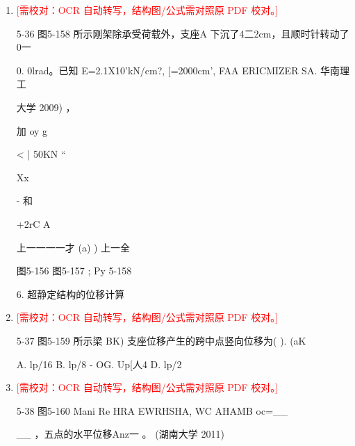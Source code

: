 \documentclass[UTF8,12pt,a4paper,openany]{ctexbook}
\newcommand{\TODO}[1]{\textcolor{red}{[需校对：#1]}}
\begin{document}
\begin{enumerate}[label=\textbf{\arabic*.},leftmargin=2em]
\item \TODO{OCR 自动转写，结构图/公式需对照原 PDF 校对。}\par 5-36 图5-158 所示刚架除承受荷载外，支座A 下沉了4二2cm，且顺时针转动了0一\par 0. 0lrad。已知 E=2.1X10'kN/cm?, [=2000cm', FAA ERICMIZER SA. 华南理工\par 大学 2009)                              ，\par 加       oy        g\par <              |      50KN              “\par Xx\par -                                   和\par +2rC                                              A\par 上一一一一才           (a)                )          上一全\par 图5-156                    图5-157        ;   Py 5-158\par 6. 超静定结构的位移计算
\item \TODO{OCR 自动转写，结构图/公式需对照原 PDF 校对。}\par 5-37 图5-159 所示梁 BK) 支座位移产生的跨中点竖向位移为(  ). (aK\par A. lp/16        B. lp/8 - OG. Up[人4        D. lp/2
\item \TODO{OCR 自动转写，结构图/公式需对照原 PDF 校对。}\par 5-38 图5-160 Mani Re HRA EWRHSHA, WC AHAMB oc=\_\_\par \_\_ ，五点的水平位移Anz一        。 (湖南大学 2011)

\end{enumerate}
\end{document}

